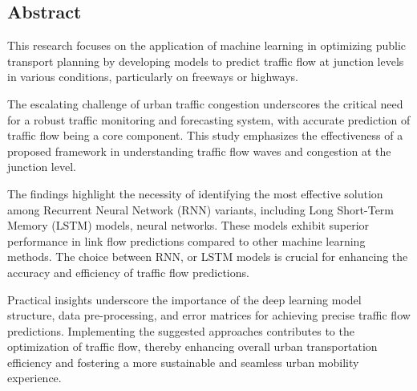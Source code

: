\begin{titlepage}
    
    \section*{Abstract}
\begin{flushright}
   
    \justifying
    This research focuses on the application of machine learning in optimizing public transport planning by developing models to predict traffic flow at junction levels in various conditions, particularly on freeways or highways.

    The escalating challenge of urban traffic congestion underscores the critical need for a robust traffic monitoring and forecasting system, with accurate prediction of traffic flow being a core component. This study emphasizes the effectiveness of a proposed framework in understanding traffic flow waves and congestion at the junction level.

    The findings highlight the necessity of identifying the most effective solution among Recurrent Neural Network (RNN) variants, including Long Short-Term Memory (LSTM) models, neural networks. These models exhibit superior performance in link flow predictions compared to other machine learning methods. The choice between RNN, or LSTM models is crucial for enhancing the accuracy and efficiency of traffic flow predictions.

    Practical insights underscore the importance of the deep learning model structure, data pre-processing, and error matrices for achieving precise traffic flow predictions. Implementing the suggested approaches contributes to the optimization of traffic flow, thereby enhancing overall urban transportation efficiency and fostering a more sustainable and seamless urban mobility experience.
\end{flushright}
\end{titlepage}

